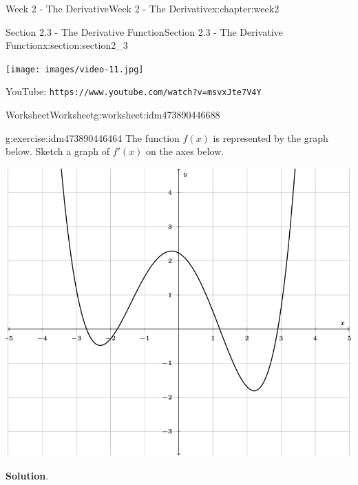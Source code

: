 \documentclass[oneside,10pt,]{book}
\newcommand{\blocktitlefont}{\relax}
\newcommand{\mono}[1]{\texttt{#1}}
\numberwithin{equation}{section}
\newlength{\qrsize}
\newlength{\previewwidth}
\begin{document}
\begin{chapterptx}{Week 2 - The Derivative}{}{Week 2 - The Derivative}{}{}{x:chapter:week2}
\begin{sectionptx}{Section 2.3 - The Derivative Function}{}{Section 2.3 - The Derivative Function}{}{}{x:section:section2_3}
\begin{tcbraster}[raster columns=2, raster column skip=1pt, raster halign=center, raster force size=false, raster left skip=0pt, raster right skip=0pt]
\begin{tcolorbox}[previewstyle, width=\previewwidth]%
\texttt{[image: images/video-11.jpg]}%
\end{tcolorbox}%
\begin{tcolorbox}[qrstyle]%
{\hypersetup{urlcolor=black}}%
\end{tcolorbox}%
\begin{tcolorbox}[captionstyle]%
\small YouTube: \mono{https://www.youtube.com/watch?v=msvxJte7V4Y}\end{tcolorbox}%
\end{tcbraster}%
%
%
\typeout{************************************************}
\typeout{************************************************}
%
\begin{worksheet-subsection}{Worksheet}{}{Worksheet}{}{}{g:worksheet:idm473890446688}
\begin{divisionexercise}{1}{}{}{g:exercise:idm473890446464}%
The function \(f(x)\) is represented by the graph below. Sketch a graph of \(f'(x)\) on the axes below. \begin{image}{0}{1}{0}%
\includegraphics[width=\linewidth]{images/Math140WkshtDerivative2G1.png}
\end{image}%
%
\textbf{\blocktitlefont Solution}.\hypertarget{g:solution:idm473890446336}{}\quad{}\begin{image}{0}{1}{0}%

\end{image}
\end{divisionexercise}
\end{worksheet-subsection}
\end{sectionptx}
\end{chapterptx}
\end{document}
